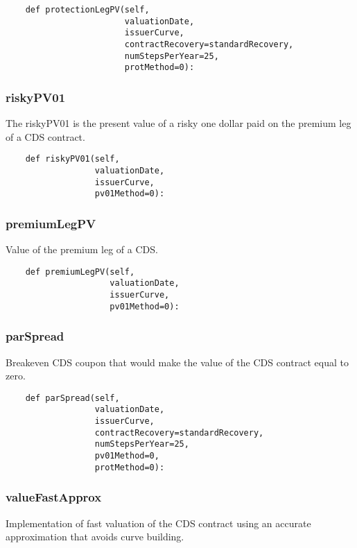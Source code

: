 \documentclass[twoside,11pt]{book}
\begin{document}
\begin{lstlisting}
    def protectionLegPV(self,
                        valuationDate,
                        issuerCurve,
                        contractRecovery=standardRecovery,
                        numStepsPerYear=25,
                        protMethod=0):
\end{lstlisting}

\subsubsection*{{\bf riskyPV01}}
The riskyPV01 is the present value of a risky one dollar paid on the premium leg of a CDS contract.  

\begin{lstlisting}
    def riskyPV01(self,
                  valuationDate,
                  issuerCurve,
                  pv01Method=0):
\end{lstlisting}

\subsubsection*{{\bf premiumLegPV}}
Value of the premium leg of a CDS.  

\begin{lstlisting}
    def premiumLegPV(self,
                     valuationDate,
                     issuerCurve,
                     pv01Method=0):
\end{lstlisting}

\subsubsection*{{\bf parSpread}}
Breakeven CDS coupon that would make the value of the CDS contract equal to zero.  

\begin{lstlisting}
    def parSpread(self,
                  valuationDate,
                  issuerCurve,
                  contractRecovery=standardRecovery,
                  numStepsPerYear=25,
                  pv01Method=0,
                  protMethod=0):
\end{lstlisting}

\subsubsection*{{\bf valueFastApprox}}
Implementation of fast valuation of the CDS contract using an accurate approximation that avoids curve building.  
\end{document}

